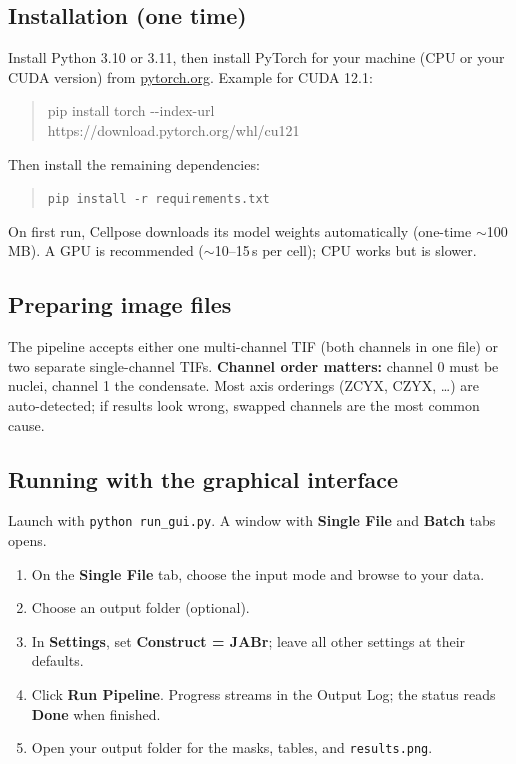 \documentclass[11pt]{article}
\newcommand{\code}[1]{\texttt{\small #1}}
\begin{document}
\subsection{Installation (one time)}
Install Python 3.10 or 3.11, then install PyTorch for your machine (CPU or your CUDA
version) from \href{https://pytorch.org/get-started/locally/}{pytorch.org}. Example for CUDA 12.1:
\begin{quote}\ttfamily\small pip install torch -{}-index-url\\ \hspace*{1.5em}https://download.pytorch.org/whl/cu121\end{quote}
Then install the remaining dependencies:
\begin{quote}\code{pip install -r requirements.txt}\end{quote}
On first run, Cellpose downloads its model weights automatically (one-time
$\sim$100\,MB). A GPU is recommended ($\sim$10--15\,s per cell); CPU works but is slower.

\subsection{Preparing image files}
The pipeline accepts either one multi-channel TIF (both channels in one file) or two
separate single-channel TIFs. \textbf{Channel order matters:} channel 0 must be nuclei,
channel 1 the condensate. Most axis orderings (ZCYX, CZYX, \dots) are auto-detected; if
results look wrong, swapped channels are the most common cause.

\subsection{Running with the graphical interface}
Launch with \code{python run\_gui.py}. A window with \textbf{Single File} and \textbf{Batch}
tabs opens.
\begin{enumerate}\setlength{\itemsep}{1pt}
\item On the \textbf{Single File} tab, choose the input mode and browse to your data.
\item Choose an output folder (optional).
\item In \textbf{Settings}, set \textbf{Construct = JABr}; leave all other settings at their defaults.
\item Click \textbf{Run Pipeline}. Progress streams in the Output Log; the status reads \textbf{Done} when finished.
\item Open your output folder for the masks, tables, and \code{results.png}.
\end{enumerate}
\end{document}
